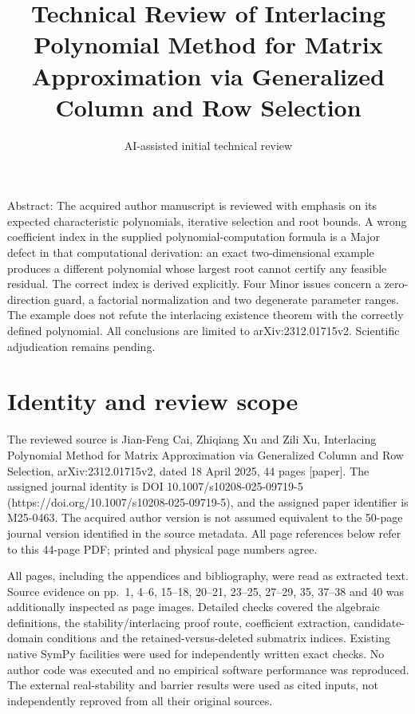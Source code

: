 \documentclass[10pt]{article}
\title{Technical Review of
Interlacing Polynomial Method for Matrix Approximation via Generalized Column and Row Selection}
\author{AI-assisted initial technical review}
\date{}
\begin{document}
\maketitle
Abstract: The acquired author manuscript is reviewed with emphasis on its expected characteristic polynomials, iterative selection and root bounds. A wrong coefficient index in the supplied polynomial-computation formula is a Major defect in that computational derivation: an exact two-dimensional example produces a different polynomial whose largest root cannot certify any feasible residual. The correct index is derived explicitly. Four Minor issues concern a zero-direction guard, a factorial normalization and two degenerate parameter ranges. The example does not refute the interlacing existence theorem with the correctly defined polynomial. All conclusions are limited to arXiv:2312.01715v2. Scientific adjudication remains pending.\par
\section*{Identity and review scope}
The reviewed source is Jian-Feng Cai, Zhiqiang Xu and Zili Xu, Interlacing Polynomial Method for Matrix Approximation via Generalized Column and Row Selection, arXiv:2312.01715v2, dated 18 April 2025, 44 pages [paper]. The assigned journal identity is DOI 10.1007/s10208-025-09719-5 (https://doi.org/10.1007/s10208-025-09719-5), and the assigned paper identifier is M25-0463. The acquired author version is not assumed equivalent to the 50-page journal version identified in the source metadata. All page references below refer to this 44-page PDF; printed and physical page numbers agree.\par
All pages, including the appendices and bibliography, were read as extracted text. Source evidence on pp. 1, 4–6, 15–18, 20–21, 23–25, 27–29, 35, 37–38 and 40 was additionally inspected as page images. Detailed checks covered the algebraic definitions, the stability/interlacing proof route, coefficient extraction, candidate-domain conditions and the retained-versus-deleted submatrix indices. Existing native SymPy facilities were used for independently written exact checks. No author code was executed and no empirical software performance was reproduced. The external real-stability and barrier results were used as cited inputs, not independently reproved from all their original sources.\par
\end{document}

